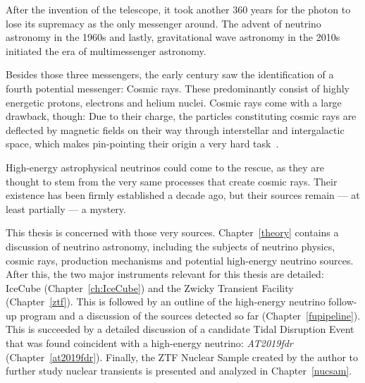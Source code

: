 After the invention of the telescope, it took another 360 years for the photon to lose its supremacy as the only messenger around. The advent of neutrino astronomy in the 1960s and lastly, gravitational wave astronomy in the 2010s initiated the era of multimessenger astronomy.

Besides those three messengers, the early  century saw the identification of a fourth potential messenger: Cosmic rays. These predominantly consist of highly energetic protons, electrons and helium nuclei. Cosmic rays come with a large drawback, though: Due to their charge, the particles constituting cosmic rays are deflected by magnetic fields on their way through interstellar and intergalactic space, which makes pin-pointing their origin a very hard task~\cite{Beckman2021}.

High-energy astrophysical neutrinos could come to the rescue, as they are thought to stem from the very same processes that create cosmic rays. Their existence has been firmly established a decade ago, but their sources remain --- at least partially --- a mystery.

This thesis is concerned with those very sources. Chapter~\ref{theory} contains a discussion of neutrino astronomy, including the subjects of neutrino physics, cosmic rays, production mechanisms and potential high-energy neutrino sources. After this, the two major instruments relevant for this thesis are detailed: IceCube (Chapter~\ref{ch:IceCube}) and the Zwicky Transient Facility (Chapter~\ref{ztf}). This is followed by an outline of the high-energy neutrino follow-up program and a discussion of the sources detected so far (Chapter~\ref{fupipeline}). This is succeeded by a detailed discussion of a candidate Tidal Disruption Event that was found coincident with a high-energy neutrino: \textit{AT2019fdr} (Chapter~\ref{at2019fdr}). Finally, the ZTF Nuclear Sample created by the author to further study nuclear transients is presented and analyzed in Chapter~\ref{nucsam}.